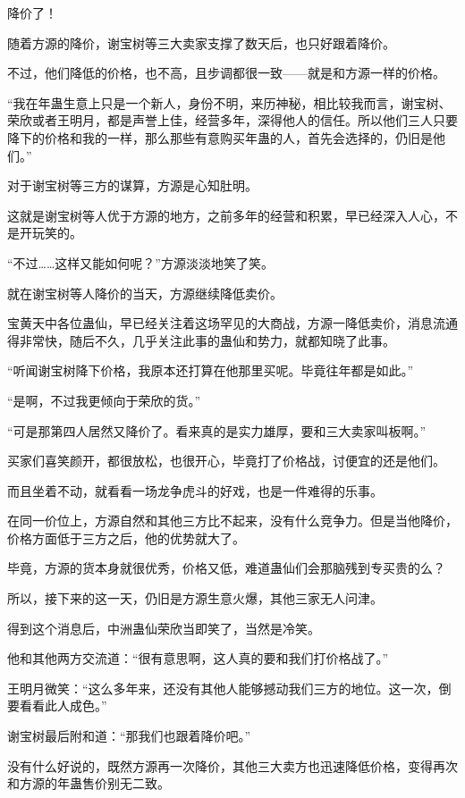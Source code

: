 
\begin{this_body}

降价了！

随着方源的降价，谢宝树等三大卖家支撑了数天后，也只好跟着降价。

不过，他们降低的价格，也不高，且步调都很一致——就是和方源一样的价格。

“我在年蛊生意上只是一个新人，身份不明，来历神秘，相比较我而言，谢宝树、荣欣或者王明月，都是声誉上佳，经营多年，深得他人的信任。所以他们三人只要降下的价格和我的一样，那么那些有意购买年蛊的人，首先会选择的，仍旧是他们。”

对于谢宝树等三方的谋算，方源是心知肚明。

这就是谢宝树等人优于方源的地方，之前多年的经营和积累，早已经深入人心，不是开玩笑的。

“不过……这样又能如何呢？”方源淡淡地笑了笑。

就在谢宝树等人降价的当天，方源继续降低卖价。

宝黄天中各位蛊仙，早已经关注着这场罕见的大商战，方源一降低卖价，消息流通得非常快，随后不久，几乎关注此事的蛊仙和势力，就都知晓了此事。

“听闻谢宝树降下价格，我原本还打算在他那里买呢。毕竟往年都是如此。”

“是啊，不过我更倾向于荣欣的货。”

“可是那第四人居然又降价了。看来真的是实力雄厚，要和三大卖家叫板啊。”

买家们喜笑颜开，都很放松，也很开心，毕竟打了价格战，讨便宜的还是他们。

而且坐着不动，就看看一场龙争虎斗的好戏，也是一件难得的乐事。

在同一价位上，方源自然和其他三方比不起来，没有什么竞争力。但是当他降价，价格方面低于三方之后，他的优势就大了。

毕竟，方源的货本身就很优秀，价格又低，难道蛊仙们会那脑残到专买贵的么？

所以，接下来的这一天，仍旧是方源生意火爆，其他三家无人问津。

得到这个消息后，中洲蛊仙荣欣当即笑了，当然是冷笑。

他和其他两方交流道：“很有意思啊，这人真的要和我们打价格战了。”

王明月微笑：“这么多年来，还没有其他人能够撼动我们三方的地位。这一次，倒要看看此人成色。”

谢宝树最后附和道：“那我们也跟着降价吧。”

没有什么好说的，既然方源再一次降价，其他三大卖方也迅速降低价格，变得再次和方源的年蛊售价别无二致。


\end{this_body}
